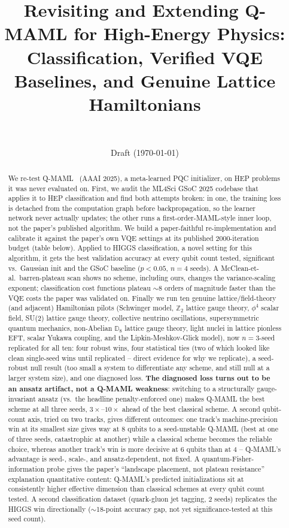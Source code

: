 \documentclass[11pt]{article}
\title{Revisiting and Extending Q-MAML for High-Energy Physics:\\
Classification, Verified VQE Baselines, and Genuine Lattice Hamiltonians}
\author{\todo{author list} \\ \todo{affiliation(s)}}
\date{Draft (\today)}
\begin{document}
\maketitle

\begin{abstract}
We re-test Q-MAML~\citep{leeqmaml2025} (AAAI 2025), a meta-learned PQC initializer, on HEP problems it was
never evaluated on. First, we audit the ML4Sci GSoC 2025 codebase that applies it to HEP classification and
find both attempts broken: in one, the training loss is detached from the computation graph before
backpropagation, so the learner network never actually updates; the other runs a first-order-MAML-style
inner loop, not the paper's published algorithm. We build a paper-faithful re-implementation and calibrate
it against the paper's own VQE settings at its published 2000-iteration budget (table below).
Applied to HIGGS classification, a novel setting for this algorithm, it gets the best validation accuracy at
every qubit count tested, significant vs.\ Gaussian init and the GSoC baseline ($p<0.05$, $n=4$ seeds). A
McClean-et-al.\ barren-plateau scan shows no scheme, including ours, changes the variance-scaling exponent;
classification cost functions plateau $\sim$8 orders of magnitude faster than the VQE costs the paper was
validated on. Finally we run ten genuine lattice/field-theory (and adjacent) Hamiltonian pilots (Schwinger
model, $\mathbb{Z}_2$ lattice gauge theory, $\phi^4$ scalar field, SU(2) lattice gauge theory, collective
neutrino oscillations, supersymmetric quantum mechanics, non-Abelian $\mathbb{D}_8$ lattice gauge theory,
light nuclei in lattice pionless EFT, scalar Yukawa coupling, and the Lipkin-Meshkov-Glick model), now
$n{=}3$-seed replicated for all ten: four robust wins, four statistical ties (two of which looked like
clean single-seed wins until replicated -- direct evidence for why we replicate), a seed-robust null result
(too small a system to differentiate any scheme, and still null at a larger system size), and one diagnosed
loss. \textbf{The diagnosed loss turns out to be an ansatz artifact, not a Q-MAML weakness}: switching to a
structurally gauge-invariant ansatz (vs.\ the headline penalty-enforced one) makes Q-MAML the best scheme at
all three seeds, $3\times$--$10\times$ ahead of the best classical scheme. A second qubit-count axis, tried
on two tracks, gives different outcomes: one track's machine-precision win at its smallest size gives way
at 8 qubits to a seed-unstable Q-MAML (best at one of three seeds, catastrophic at another) while a
classical scheme becomes the reliable choice, whereas another track's win is more decisive at 6 qubits than
at 4 -- Q-MAML's advantage is seed-, scale-, and ansatz-dependent, not fixed.
A quantum-Fisher-information probe gives the paper's ``landscape placement, not plateau resistance''
explanation quantitative content: Q-MAML's predicted initializations sit at consistently higher effective
dimension than classical schemes at every qubit count tested. A second classification dataset (quark-gluon
jet tagging, 2 seeds) replicates the HIGGS win directionally ($\sim$18-point accuracy gap, not yet
significance-tested at this seed count).


\end{abstract}
\end{document}
